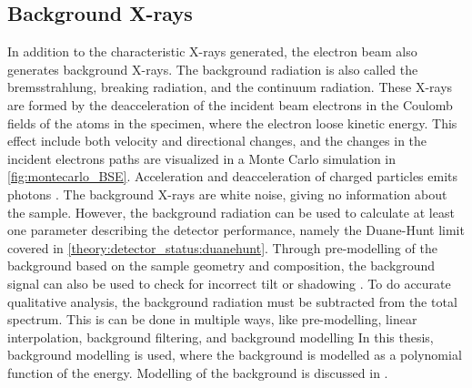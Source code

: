 








\subsection{Background X-rays}
\label{theory:xray_formation:background}


In addition to the characteristic X-rays generated, the electron beam also generates background X-rays.
The background radiation is also called the bremsstrahlung, breaking radiation, and the continuum radiation.
These X-rays are formed by the deacceleration of the incident beam electrons in the Coulomb fields of the atoms in the specimen, where the electron loose kinetic energy.
This effect include both velocity and directional changes, and the changes in the incident electrons paths are visualized in a Monte Carlo simulation in \cref{fig:montecarlo_BSE}.
Acceleration and deacceleration of charged particles emits photons \cite{notaros_electromagnetics_2010}.
The background X-rays are white noise, giving no information about the sample.
However, the background radiation can be used to calculate at least one parameter describing the detector performance, namely the Duane-Hunt limit covered in \cref{theory:detector_status:duanehunt}.
Through pre-modelling of the background based on the sample geometry and composition, the background signal can also be used to check for incorrect tilt or shadowing \cite{edax_insight_2019}.
To do accurate qualitative analysis, the background radiation must be subtracted from the total spectrum.
This is can be done in multiple ways, like pre-modelling, linear interpolation, background filtering, and background modelling \cite{liao2006practical}
In this thesis, background modelling is used, where the background is modelled as a polynomial function of the energy.
Modelling of the background is discussed in .


